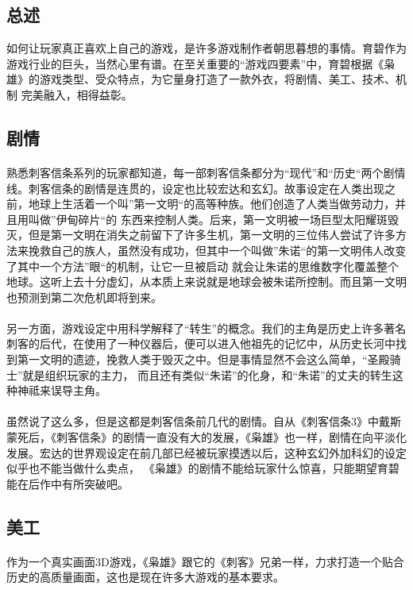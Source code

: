 \documentclass{article} \usepackage{CJK}
\begin{document}
\subsection{总述}
如何让玩家真正喜欢上自己的游戏，是许多游戏制作者朝思暮想的事情。育碧作为游戏行业的巨头，当然心里有谱。在至关重要的“游戏四要素”中，育碧根据《枭雄》的游戏类型、受众特点，为它量身打造了一款外衣，将剧情、美工、技术、机制
完美融入，相得益彰。
\subsection{剧情}
\paragraph{}
熟悉刺客信条系列的玩家都知道，每一部刺客信条都分为“现代”和“历史“两个剧情线。刺客信条的剧情是连贯的，设定也比较宏达和玄幻。故事设定在人类出现之前，地球上生活着一个叫”第一文明“的高等种族。他们创造了人类当做劳动力，并且用叫做”伊甸碎片“的
东西来控制人类。后来，第一文明被一场巨型太阳耀斑毁灭，但是第一文明在消失之前留下了许多生机，第一文明的三位伟人尝试了许多方法来挽救自己的族人，虽然没有成功，但其中一个叫做”朱诺“的第一文明伟人改变了其中一个方法”眼“的机制，让它一旦被启动
就会让朱诺的思维数字化覆盖整个地球。这听上去十分虚幻，从本质上来说就是地球会被朱诺所控制。而且第一文明也预测到第二次危机即将到来。
\paragraph{}
另一方面，游戏设定中用科学解释了“转生”的概念。我们的主角是历史上许多著名刺客的后代，在使用了一种仪器后，便可以进入他祖先的记忆中，从历史长河中找到第一文明的遗迹，挽救人类于毁灭之中。但是事情显然不会这么简单，“圣殿骑士”就是组织玩家的主力，
而且还有类似“朱诺”的化身，和“朱诺”的丈夫的转生这种神祗来误导主角。
\paragraph{}
虽然说了这么多，但是这都是刺客信条前几代的剧情。自从《刺客信条3》中戴斯蒙死后，《刺客信条》的剧情一直没有大的发展，《枭雄》也一样，剧情在向平淡化发展。宏达的世界观设定在前几部已经被玩家摸透以后，这种玄幻外加科幻的设定似乎也不能当做什么卖点，
《枭雄》的剧情不能给玩家什么惊喜，只能期望育碧能在后作中有所突破吧。
\subsection{美工}
\paragraph{}
作为一个真实画面3D游戏，《枭雄》跟它的《刺客》兄弟一样，力求打造一个贴合历史的高质量画面，这也是现在许多大游戏的基本要求。
\end{document}
